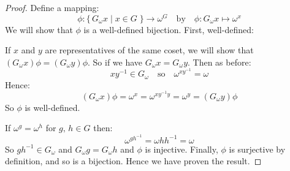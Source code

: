 \begin{proof}
    Define a mapping:
    \[ \phi:\{\,G_\omega x \mid x \in G\;\} \to \omega^G \quad \text{by} \quad \phi:G_\omega x \mapsto \omega^x\]
    We will show that \(\phi\) is a well-defined bijection.
    First, well-defined:

    If \(x\) and \(y\) are representatives of the same coset, we will show that \((G_\omega x)\phi = (G_\omega y)\phi\).
    So if we have \(G_\omega x = G_\omega y\).
    Then as before:
    \[ xy^{-1} \in G_\omega \quad \text{so} \quad \omega^{xy^{-1}} = \omega\]
    Hence:
    \[ (G_\omega x)\phi = \omega^x = \omega^{xy^{-1} y} = \omega^y = (G_\omega y)\phi \]
    So \(\phi\) is well-defined.

    If \(\omega^g = \omega^h\) for \(g,\,h \in G\) then:
    \[ \omega^{gh^{-1}} = \omega{hh^{-1}} = \omega \]
    So \(gh^{-1} \in G_\omega\) and \(G_\omega g = G_\omega h\) and \(\phi\) is injective.
    Finally, \(\phi\) is surjective by definition, and so is a bijection.
    Hence we have proven the result.
\end{proof}


